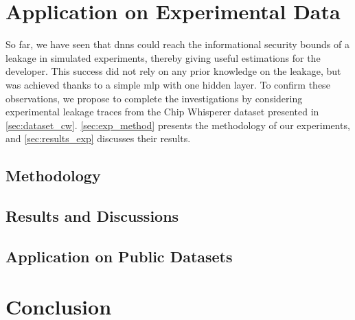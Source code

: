 \section{Application on Experimental Data}
    \label{sec:experiments}
    So far, we have seen that \glspl{dnn} could reach the informational security bounds of a leakage in simulated experiments, thereby giving useful estimations for the developer.
    This success did not rely on any prior knowledge on the leakage, but was achieved thanks to a simple \gls{mlp} with one hidden layer. 
    To confirm these observations, we propose to complete the investigations by considering experimental leakage traces from the \textsf{Chip Whisperer} dataset presented in \autoref{sec:dataset_cw}.
    \autoref{sec:exp_method} presents the methodology of our experiments, and \autoref{sec:results_exp} discusses their results.

\subsection{Methodology}
    \label{sec:exp_method}
    

\subsection{Results and Discussions}
    \label{sec:results_exp}
    

\subsection{Application on Public Datasets}
    \label{sec:experiments_datasets}
    

\section{Conclusion}
    \label{sec:ccl_ches}
    
